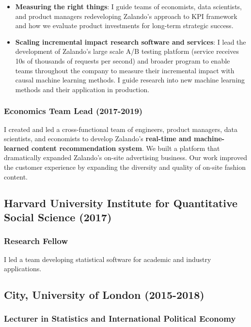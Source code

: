 \documentclass[a4paper]{article}
\begin{document}
\begin{itemize}

  \item \textbf{Measuring the right things}: I guide teams of economists, data scientists, and product managers redeveloping Zalando's approach to KPI framework and how we evaluate product investments for long-term strategic success.

  \item \textbf{Scaling incremental impact research software and services}: I lead the development of Zalando's large scale A/B testing platform (service receives 10s of thousands of requests per second) and broader program to enable teams throughout the company to measure their incremental impact with causal machine learning methods. I guide research into new machine learning methods and their application in production.

\end{itemize}
  
\subsubsection*{Economics Team Lead (2017-2019)}

I created and led a cross-functional team of engineers, product managers, data scientists, and economists to develop Zalando's \textbf{real-time and machine-learned content recommendation system}. We built a platform that dramatically expanded Zalando's on-site advertising business. Our work improved the customer experience by expanding the diversity and quality of on-site fashion content.

\subsection*{Harvard University Institute for Quantitative Social Science (2017)}

\subsubsection*{Research Fellow}

I led a team developing statistical software for academic and industry applications. 

\subsection*{City, University of London (2015-2018)}

\subsubsection*{Lecturer in Statistics and International Political Economy}
\end{document}
